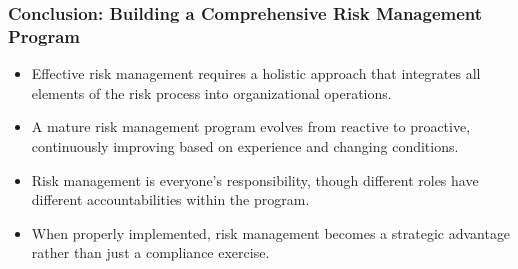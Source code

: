 \documentclass{beamer}
\begin{document}
            \begin{frame}
              \frametitle{Conclusion: Building a Comprehensive Risk Management Program}
              \begin{itemize}
                \item Effective risk management requires a holistic approach that integrates all elements of the risk process into organizational operations.
                \item A mature risk management program evolves from reactive to proactive, continuously improving based on experience and changing conditions.
                \item Risk management is everyone's responsibility, though different roles have different accountabilities within the program.
                \item When properly implemented, risk management becomes a strategic advantage rather than just a compliance exercise.
              \end{itemize}
              
              \begin{center}
              \end{center}
              \end{frame}
        
\end{document}
